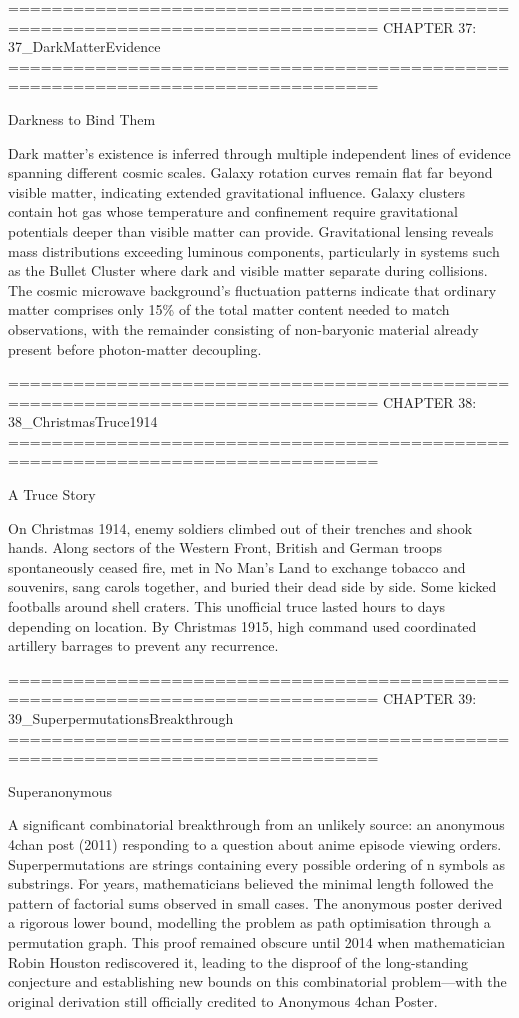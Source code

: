 ================================================================================
CHAPTER 37: 37_DarkMatterEvidence
================================================================================

Darkness to Bind Them

Dark matter's existence is inferred through multiple independent lines of evidence spanning different cosmic scales. Galaxy rotation curves remain flat far beyond visible matter, indicating extended gravitational influence. Galaxy clusters contain hot gas whose temperature and confinement require gravitational potentials deeper than visible matter can provide. Gravitational lensing reveals mass distributions exceeding luminous components, particularly in systems such as the Bullet Cluster where dark and visible matter separate during collisions. The cosmic microwave background's fluctuation patterns indicate that ordinary matter comprises only 15\% of the total matter content needed to match observations, with the remainder consisting of non-baryonic material already present before photon-matter decoupling.


================================================================================
CHAPTER 38: 38_ChristmasTruce1914
================================================================================

A Truce Story

On Christmas 1914, enemy soldiers climbed out of their trenches and shook hands. Along sectors of the Western Front, British and German troops spontaneously ceased fire, met in No Man's Land to exchange tobacco and souvenirs, sang carols together, and buried their dead side by side. Some kicked footballs around shell craters. This unofficial truce lasted hours to days depending on location. By Christmas 1915, high command used coordinated artillery barrages to prevent any recurrence.


================================================================================
CHAPTER 39: 39_SuperpermutationsBreakthrough
================================================================================

Superanonymous

A significant combinatorial breakthrough from an unlikely source: an anonymous 4chan post (2011) responding to a question about anime episode viewing orders. Superpermutations are strings containing every possible ordering of n symbols as substrings. For years, mathematicians believed the minimal length followed the pattern of factorial sums observed in small cases. The anonymous poster derived a rigorous lower bound, modelling the problem as path optimisation through a permutation graph. This proof remained obscure until 2014 when mathematician Robin Houston rediscovered it, leading to the disproof of the long-standing conjecture and establishing new bounds on this combinatorial problem—with the original derivation still officially credited to \QSOpen{}Anonymous 4chan Poster.\QSClose{}


